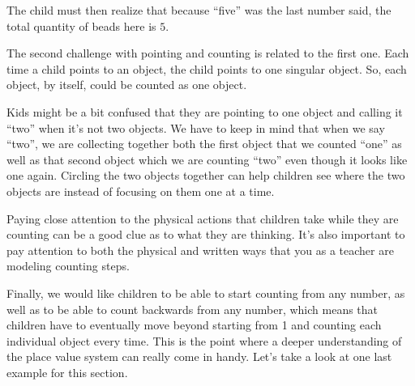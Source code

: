 \documentclass{ximera}
\begin{document}
\begin{center}
\end{center}
The child must then realize that because ``five'' was the last number said, the total quantity of beads here is $5$.

The second challenge with pointing and counting is related to the first one. Each time a child points to an object, the child points to one singular object. So, each object, by itself, could be counted as one object.
\begin{center}
\end{center}
Kids might be a bit confused that they are pointing to one object and calling it ``two'' when it's not two objects. We have to keep in mind that when we say ``two'', we are collecting together both the first object that we counted ``one'' as well as that second object which we are counting ``two'' even though it looks like one again. Circling the two objects together can help children see where the two objects are instead of focusing on them one at a time.

\begin{center}
\end{center}
Paying close attention to the physical actions that children take while they are counting can be a good clue as to what they are thinking. It's also important to pay attention to both the physical and written ways that you as a teacher are modeling counting steps.


Finally, we would like children to be able to start counting from any number, as well as to be able to count backwards from any number, which means that children have to eventually move beyond starting from 1 and counting each individual object every time. This is the point where a deeper understanding of the place value system can really come in handy. Let's take a look at one last example for this section.
\end{document}
